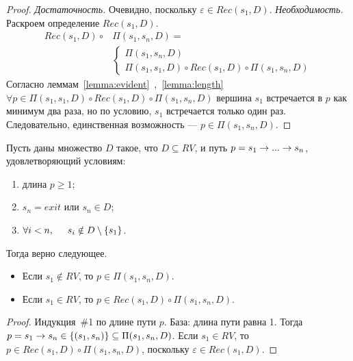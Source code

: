 \begin{defn}
\begin{proof}
\emph{Достаточность.} Очевидно, поскольку $\varepsilon \in Rec(s_1,D)$.
\emph{Необходимость.} Раскроем определение $Rec(s_1,D)$.
\begin{equation}
    \begin{aligned}
    Rec(s_1,D) \circ & \Pi(s_1,s_n,D) = \\ 
                     & \begin{cases} 
            \Pi(s_1,s_n,D) \\
            \Pi(s_1,s_1,D) \circ Rec(s_1,D) \circ \Pi(s_1, s_n,D)
            \end{cases}
    \end{aligned}
\end{equation}
Согласно леммам~\ref{lemma:evident}~,~\ref{lemma:length} $\forall p \in \Pi(s_1, s_1,D) \circ Rec(s_1,D) \circ \Pi(s_1, s_n,D)$
вершина $s_1$ встречается в $p$ как минимум два раза, но по условию, $s_1$ встречается только один раз.
Следовательно, единственная возможность --- $p \in \Pi(s_1,s_n,D)$.
\end{proof}

\begin{lm}
\label{lemma:main}
Пусть даны множество $D$ такое, что $D \subseteq RV$, и путь $p = s_1 \rightarrow ... \rightarrow s_n$, удовлетворяющий условиям:
\begin{enumerate}
    \item длина $p \geq 1$;
    \item $s_n = exit$ или $s_n \in D$;
    \item $\forall i < n, \hspace{5mm} s_i \notin D \setminus \{s_1\}$.
\end{enumerate}
Тогда верно следующее.
\begin{itemize}
    \item Если $s_1 \notin RV$, то $p \in \Pi(s_1,s_n,D)$.  
    \item Если $s_1 \in RV$, то $p \in Rec(s_1,D) \circ \Pi(s_1,s_n,D)$.  
\end{itemize}
\end{lm}

\begin{proof}
Индукция~\#1 по длине пути $p$. 
База: длина пути равна 1. Тогда $p = s_1 \rightarrow s_n \in \{(s_1,s_n)\} \subseteq \Pi(s_1,s_n,D)$.
Если $s_1 \in RV$, то $p \in Rec(s_1,D) \circ \Pi(s_1,s_n,D)$, поскольку $\varepsilon \in Rec(s_1,D)$.


\end{proof}
\end{defn}
